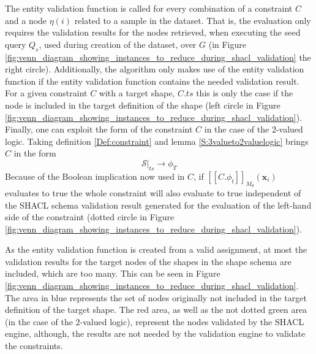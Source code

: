 The entity validation function is called for every combination of a constraint $C$ and a node $\eta(i)$ related to a sample in the dataset. That is, the evaluation only requires the validation results for the nodes retrieved, when executing the seed query $Q_s$, used during creation of the dataset, over $G$ (in Figure \ref{fig:venn_diagram_showing_instances_to_reduce_during_shacl_validation} the right circle). Additionally, the algorithm only makes use of the entity validation function if the entity validation function contains the needed validation result. For a given constraint $C$ with a target shape, $C.ts$ this is only the case if the node is included in the target definition of the shape (left circle in Figure \ref{fig:venn_diagram_showing_instances_to_reduce_during_shacl_validation}). Finally, one can exploit the form of the constraint $C$ in the case of the 2-valued logic. Taking definition \ref{Def:constraint} and lemma \ref{S:3valueto2valuelogic} brings $C$ in the form \[\mathcal{S}\big|_{ts} \rightarrow \phi_{T}\] 
Because of the Boolean implication now used in $C$, if $[[C.\phi_t]]_{M_\theta}(\mathbf{x}_i)$ evaluates to true the whole constraint will also evaluate to true independent of the SHACL schema validation result generated for the evaluation of the left-hand side of the constraint (dotted circle in Figure \ref{fig:venn_diagram_showing_instances_to_reduce_during_shacl_validation}). 

As the entity validation function is created from a valid assignment, at most the validation results for the target nodes of the shapes in the shape schema are included, which are too many. This can be seen in Figure \ref{fig:venn_diagram_showing_instances_to_reduce_during_shacl_validation}. The area in blue represents the set of nodes originally not included in the target definition of the target shape. The red area, as well as the not dotted green area (in the case of the 2-valued logic), represent the nodes validated by the SHACL engine, although, the results are not needed by the validation engine to validate the constraints.

